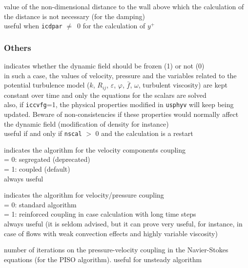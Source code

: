 {value of the non-dimensional distance to the wall above which the
calculation of the distance is not necessary (for the damping)\\
useful when {\tt icdpar} $\neq$\ 0 for the calculation of $y^+$}


\subsubsection{Others}

{indicates whether the dynamic field should be frozen (1) or not (0)\\
in such a case, the values of velocity,
pressure and the variables related to the potential turbulence model
($k$, $R_{ij}$, $\varepsilon$, $\varphi$, $\bar{f}$, $\omega$, turbulent viscosity) are kept
constant over time and only the equations for the scalars are solved\\
also, if {\tt iccvfg}=1, the physical properties modified in \texttt{usphyv} will keep
being updated. Beware of non-consistencies if these properties would normally
affect the dynamic field (modification of density for instance)\\
useful if and only if {\tt nscal} $>$ 0 and the calculation is a restart}

{indicates the algorithm for the velocity components coupling\\
\hspace*{1.3cm}= 0: segregated (deprecated)\\
\hspace*{1.3cm}= 1: coupled (default)\\
always useful
}

{indicates the algorithm for velocity/pressure coupling\\
\hspace*{1.3cm}= 0: standard algorithm\\
\hspace*{1.3cm}= 1: reinforced coupling in case calculation with long
time steps\\
always useful (it is seldom advised, but it can prove very useful, for instance,
in case of flows with weak convection effects and highly variable viscosity)}

{number of iterations on the pressure-velocity coupling in the Navier-Stokes equations (for the PISO algorithm).
useful for unsteady algorithm
}

